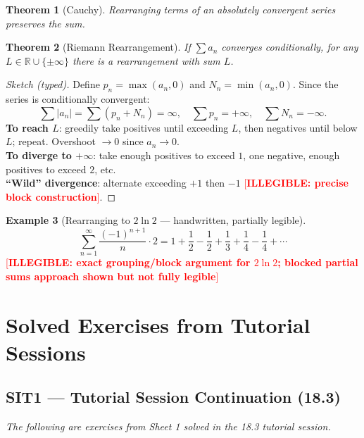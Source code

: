 \documentclass[12pt, a4paper]{article}
\newcommand{\illegible}[1][?]{\textcolor{red}{[\textbf{ILLEGIBLE: #1}]}}
\newtheorem{theorem}{Theorem}[section]
\theoremstyle{definition}
\newtheorem{example}[theorem]{Example}
\theoremstyle{remark}
\begin{document}
\begin{theorem}[Cauchy]
Rearranging terms of an \emph{absolutely} convergent series preserves the sum.
\end{theorem}

\begin{theorem}[Riemann Rearrangement]
If $\sum a_n$ converges conditionally, for any $L \in \mathbb{R}\cup\{\pm\infty\}$ there is a rearrangement with sum $L$.
\end{theorem}

\begin{proof}[Sketch (typed)]
Define $p_n = \max(a_n,0)$ and $N_n = \min(a_n,0)$. Since the series is conditionally convergent:
\[
  \sum |a_n| = \sum(p_n + N_n) = \infty, \quad \sum p_n = +\infty, \quad \sum N_n = -\infty.
\]
\textbf{To reach $L$}: greedily take positives until exceeding $L$, then negatives until below $L$; repeat. Overshoot $\to 0$ since $a_n \to 0$.\\
\textbf{To diverge to $+\infty$}: take enough positives to exceed $1$, one negative, enough positives to exceed $2$, etc.\\
\textbf{``Wild'' divergence}: alternate exceeding $+1$ then $-1$ \illegible[precise block construction].
\end{proof}

\begin{example}[Rearranging to $2\ln 2$ --- handwritten, partially legible]
\[
  \sum_{n=1}^\infty \frac{(-1)^{n+1}}{n} \cdot 2
  = 1 + \frac{1}{2} - \frac{1}{2} + \frac{1}{3} + \frac{1}{4} - \frac{1}{4} + \cdots
\]
\illegible[exact grouping/block argument for $2\ln 2$; blocked partial sums approach shown but not fully legible]
\end{example}

\section{Solved Exercises from Tutorial Sessions}

\subsection{SIT1 --- Tutorial Session Continuation (18.3)}

\textit{The following are exercises from Sheet 1 solved in the 18.3 tutorial session.}
\end{document}

